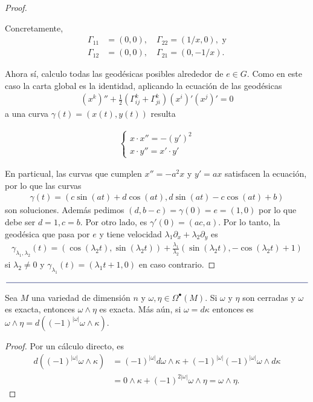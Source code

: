 \documentclass[11pt]{article}
\newcommand{\paint}[1]{\color{color}{#1}}
\newcommand{\paintline}{\begin{center}
$\paint{
\rule{400pt}{0.5pt}
}$
\vspace{10pt}
\end{center}}
\newenvironment{lemma}[2][Lema]{\begin{trivlist}
\item[\hskip \labelsep \paint{{\bfseries #1}}\hskip \labelsep {\bfseries #2.}]}{\end{trivlist}}
\begin{document}
\begin{proof}
\begin{itemize}[listparindent = \parindent]
Concretamente,
\begin{align*}
\Gamma_{11} &= (0,0), \quad
\Gamma_{22} = (1/x,0), \text{ y}\\
\Gamma_{12} &= (0,0), \quad
\Gamma_{21} = (0,-1/x).
\end{align*}

Ahora sí, calculo todas las geodésicas posibles alrededor de $e \in G$. Como en este caso la carta global es la identidad, aplicando la ecuación de las geodésicas 
\begin{align*}
(x^k)'' + \frac{1}{2}(\Gamma_{ij}^k + \Gamma_{ji}^k)(x^i)'(x^j)' = 0
\end{align*}
a una curva $\gamma(t) = (x(t),y(t))$ resulta

\end{itemize}
\begin{align*}
\begin{cases}
x \cdot x'' = -(y')^2\\
x\cdot y'' = x'\cdot y'
\end{cases}
\end{align*}

En particual, las curvas que cumplen $x'' = -a^2x$ y $y' = ax$ satisfacen la ecuación, por lo que las curvas
\begin{align*}
\gamma(t) = (c\sin(at)+d\cos(at),d\sin(at)-c\cos(at) + b)
\end{align*}
son soluciones. Además pedimos $(d,b-c) = \gamma(0) = e = (1,0)$ por lo que debe ser $d = 1, c = b$. Por otro lado, es $\gamma'(0) = (ac,a)$. Por lo tanto, la geodésica que pasa por $e$ y tiene velocidad $\lambda_1 \partial_x + \lambda_2 \partial_y$ es
\begin{align*}
\gamma_{\lambda_1,\lambda_2}(t) = (\cos(\lambda_2t),\sin(\lambda_2t))+
\frac{\lambda_1}{\lambda_2}(\sin(\lambda_2t),-\cos(\lambda_2t) + 1)
\end{align*}
si $\lambda_2 \neq 0$ y $\gamma_{\lambda_1}(t) = (\lambda_1t+1,0)$ en caso contrario.
\end{proof}

\paintline

\begin{lemma}{7} Sea $M$ una variedad de dimensión $n$ y $\omega, \eta \in \Omega^\bullet(M)$. Si $\omega$ y $\eta$ son cerradas y $\omega$ es exacta, entonces $\omega \wedge \eta$ es exacta. Más aún, si $\omega = d\kappa$ entonces es $\omega \wedge \eta = d((-1)^{|\omega|}\omega \wedge \kappa)$.
\end{lemma}
\begin{proof} Por un cálculo directo, es
\begin{align*}
d((-1)^{|\omega|}\omega \wedge \kappa) &= (-1)^{|\omega|}d\omega \wedge \kappa + (-1)^{|\omega|}(-1)^{|\omega|}\omega \wedge d\kappa\\
&= 0 \wedge \kappa + (-1)^{2|\omega|}\omega \wedge \eta = \omega \wedge \eta.
\end{align*}
\end{proof}
\end{document}
